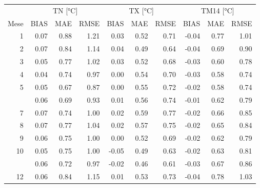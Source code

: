 
\begin{tabular}[t]{rrrrrrrrrr}
\toprule
\multicolumn{1}{c}{ } & \multicolumn{3}{c}{TN [\unit{\degreeCelsius}]} & \multicolumn{3}{c}{TX [\unit{\degreeCelsius}]} & \multicolumn{3}{c}{TM14\tnote{*} [\unit{\degreeCelsius}]} \\
\cmidrule(l{3pt}r{3pt}){2-4} \cmidrule(l{3pt}r{3pt}){5-7} \cmidrule(l{3pt}r{3pt}){8-10}
Mese & BIAS & MAE & RMSE & BIAS & MAE & RMSE & BIAS & MAE & RMSE\\
\midrule
1 & 0.07 & 0.88 & 1.21 & 0.03 & 0.52 & 0.71 & -0.04 & 0.77 & 1.01\\
2 & 0.07 & 0.84 & 1.14 & 0.04 & 0.49 & 0.64 & -0.04 & 0.69 & 0.90\\
3 & 0.05 & 0.77 & 1.02 & 0.03 & 0.52 & 0.68 & -0.03 & 0.60 & 0.78\\
4 & 0.04 & 0.74 & 0.97 & 0.00 & 0.54 & 0.70 & -0.03 & 0.58 & 0.74\\
5 & 0.05 & 0.67 & 0.87 & 0.00 & 0.55 & 0.72 & -0.02 & 0.58 & 0.74\\
\addlinespace
6 & 0.06 & 0.69 & 0.93 & 0.01 & 0.56 & 0.74 & -0.01 & 0.62 & 0.79\\
7 & 0.07 & 0.74 & 1.00 & 0.02 & 0.59 & 0.77 & -0.02 & 0.66 & 0.85\\
8 & 0.07 & 0.77 & 1.04 & 0.02 & 0.57 & 0.75 & -0.02 & 0.65 & 0.84\\
9 & 0.06 & 0.75 & 1.00 & 0.00 & 0.52 & 0.69 & -0.02 & 0.62 & 0.79\\
10 & 0.05 & 0.75 & 1.00 & -0.05 & 0.49 & 0.63 & -0.02 & 0.63 & 0.81\\
\addlinespace
11 & 0.06 & 0.72 & 0.97 & -0.02 & 0.46 & 0.61 & -0.03 & 0.67 & 0.86\\
12 & 0.06 & 0.84 & 1.15 & 0.01 & 0.53 & 0.73 & -0.04 & 0.78 & 1.03\\
\bottomrule
\end{tabular}